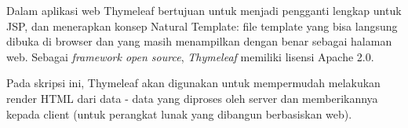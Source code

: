 Dalam aplikasi web Thymeleaf bertujuan untuk menjadi pengganti lengkap untuk JSP, dan menerapkan konsep Natural Template: file template yang bisa langsung dibuka di browser dan yang masih menampilkan dengan benar sebagai halaman web. Sebagai \textit{framework open source}, \textit{Thymeleaf} memiliki lisensi Apache 2.0.

Pada skripsi ini, Thymeleaf akan digunakan untuk mempermudah melakukan render HTML dari data - data yang diproses oleh server dan memberikannya kepada client (untuk perangkat lunak yang dibangun berbasiskan web).





